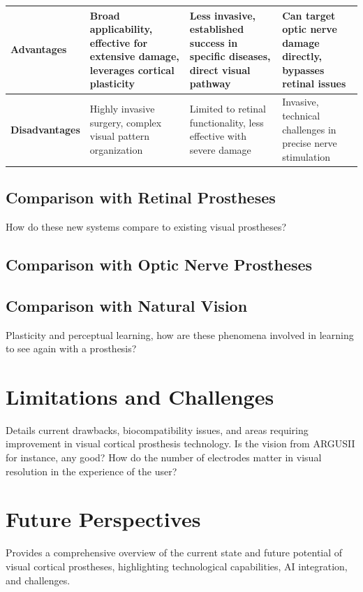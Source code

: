 \documentclass[twocolumn,10pt]{article}
\begin{document}
\begin{table}[ht!]
\begin{tabularx}{\textwidth}{X X X X}
            \textbf{Advantages}                        & Broad applicability, effective for extensive damage, leverages cortical plasticity & Less invasive, established success in specific diseases, direct visual pathway & Can target optic nerve damage directly, bypasses retinal issues \\ \hline
            \textbf{Disadvantages}                     & Highly invasive surgery, complex visual pattern organization                       & Limited to retinal functionality, less effective with severe damage            & Invasive, technical challenges in precise nerve stimulation     \\ \hline
      \end{tabularx}
\end{table}

\subsection*{Comparison with Retinal Prostheses}
How do these new systems compare to existing visual prostheses?

\subsection*{Comparison with Optic Nerve Prostheses}

\subsection*{Comparison with Natural Vision}
Plasticity and perceptual learning, how are these phenomena involved in learning
to see again with a prosthesis?

\section*{Limitations and Challenges}\label{sec:limitations}
Details current drawbacks, biocompatibility issues, and areas requiring
improvement in visual cortical prosthesis technology. Is the vision from ARGUSII
for instance, any good? How do the number of electrodes matter in visual
resolution in the experience of the user?

\section*{Future Perspectives}\label{sec:future}
Provides a comprehensive overview of the current state and future potential of
visual cortical prostheses, highlighting technological capabilities, AI
integration, and challenges.
\end{document}
